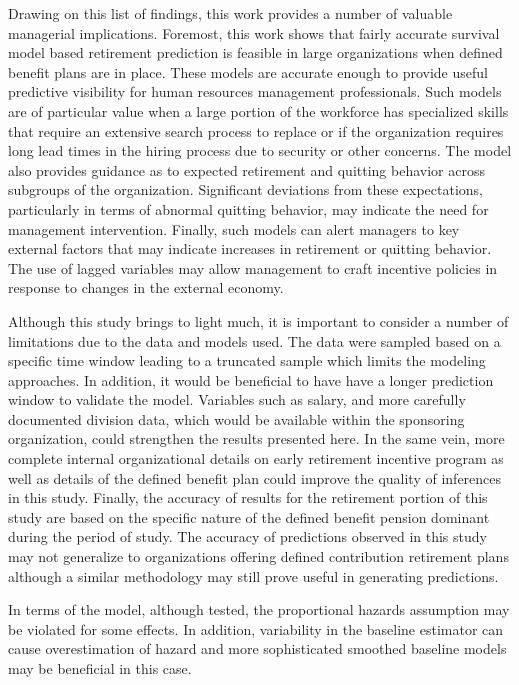 \documentclass[12pt,letterpaper]{article}
\begin{document}
Drawing on this list of findings, this work provides a number of valuable managerial implications.  Foremost, this work shows that fairly accurate survival model based retirement prediction is feasible in large organizations when defined benefit plans are in place.  These models are accurate enough to provide useful predictive visibility for human resources management professionals.  Such models are of particular value when a large portion of the workforce has specialized skills that require an extensive search process to replace or if the organization requires long lead times in the hiring process due to security or other concerns.  The model also provides guidance as to expected retirement and quitting behavior across subgroups of the organization. Significant deviations from these expectations, particularly  in terms of  abnormal quitting behavior, may indicate the need for management intervention.  Finally, such models can alert managers to key external factors that may indicate increases in retirement or quitting behavior.  The use of lagged variables may allow management to craft incentive policies in response to changes in the external economy.

Although this study brings to light much, it is important to consider a number of limitations due to the data and models used.  The data were sampled based on a specific time window leading to a truncated sample which limits the modeling approaches.  In addition,  it would be beneficial to have have a longer prediction window to validate the model.  Variables such as salary, and more carefully documented division data, which would be available within the sponsoring organization, could strengthen the results presented here.  In the same vein, more complete internal organizational details on early retirement incentive program as well as details of the defined benefit plan could improve the quality of inferences in this study.  Finally, the accuracy of results for the retirement portion of this study are based on the specific nature of the defined benefit pension dominant during the period of study.  The accuracy of predictions observed in this study may not generalize to organizations offering defined contribution retirement plans although a similar methodology may still prove useful in generating predictions.


In terms of the model, although tested, the proportional hazards assumption may be violated for some effects.  In addition, variability in the baseline estimator can cause overestimation of hazard and more sophisticated smoothed baseline models may be beneficial in this case.
\end{document}
